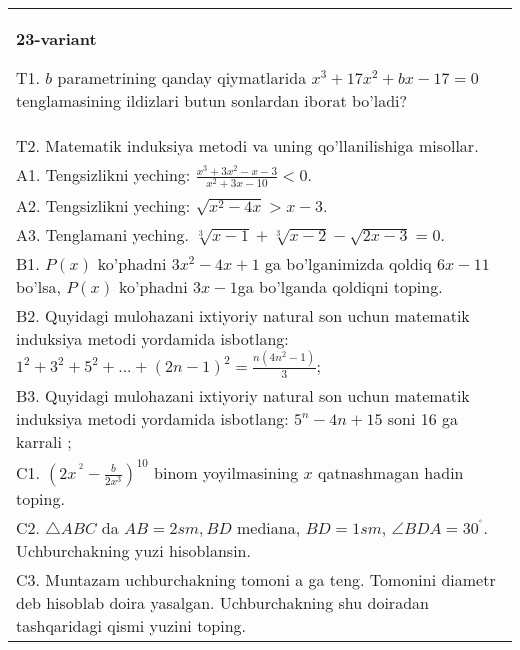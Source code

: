 \documentclass{article}
\begin{document}
\begin{tabular}{m{17cm}}
\textbf{23-variant}
\newline

T1. \(b\) parametrining qanday qiymatlarida \(x^{3} + 17x^{2} + bx - 17 = 0\) tenglamasining ildizlari butun sonlardan iborat bo'ladi? \\
T2. Matematik induksiya metodi va uning qo'llanilishiga misollar. \\
A1. Tengsizlikni yeching: \(\frac{x^{3} + 3x^{2} - x - 3}{x^{2} + 3x - 10} < 0\). \\
A2. Tengsizlikni yeching: \(\sqrt{x^{2} - 4x} > x - 3\). \\
A3. Tenglamani yeching. \(\sqrt[3]{x - 1} + \sqrt[3]{x - 2} - \sqrt{2x - 3} = 0\). \\
B1. \(P(x)\) ko'phadni \(3x^{2} - 4x + 1\) ga bo'lganimizda qoldiq \(6x - 11\) bo'lsa, \(P(x)\) ko'phadni \(3x - 1\)ga bo'lganda qoldiqni toping. \\
B2. Quyidagi mulohazani ixtiyoriy natural son uchun matematik induksiya metodi yordamida isbotlang: \(1^{2} + 3^{2} + 5^{2} + ... + (2n - 1)^{2} = \frac{n\left( 4n^{2} - 1 \right)}{3}\); \\
B3. Quyidagi mulohazani ixtiyoriy natural son uchun matematik induksiya metodi yordamida isbotlang: \(5^{n} - 4n + 15\) soni 16 ga karrali ; \\
C1. \(\left( 2x^{\ ^{2}} - \frac{b}{2x^{3}} \right)^{10}\) binom yoyilmasining \(x\) qatnashmagan hadin toping. \\
C2. \(\bigtriangleup ABC\) da \(AB = 2sm,BD\) mediana, \(BD = 1sm\), \(\angle BDA = 30^{{^\circ}}\). Uchburchakning yuzi hisoblansin. \\
C3. Muntazam uchburchakning tomoni a ga teng. Tomonini diametr deb hisoblab doira yasalgan. Uchburchakning shu doiradan tashqaridagi qismi yuzini toping. \\

\end{tabular}
\vspace{1cm}
\end{document}
